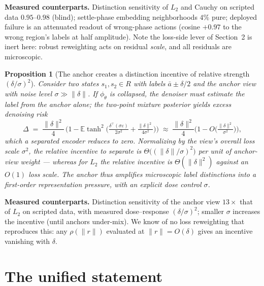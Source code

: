 \documentclass[11pt]{article}
\newtheorem{proposition}{Proposition}
\newcommand{\E}{\mathbb{E}}
\newcommand{\enc}{\phi_\theta}
\begin{document}
\noindent\textbf{Measured counterparts.} Distinction sensitivity of $L_2$ and
Cauchy on scripted data $0.95$--$0.98$ (blind); settle-phase embedding
neighborhoods $4\%$ pure; deployed failure is an attenuated readout of
wrong-phase actions (cosine $+0.97$ to the wrong region's labels at half
amplitude). Note the loss-side lever of Section~2 is inert here: robust
reweighting acts on residual \emph{scale}, and all residuals are microscopic.

\begin{proposition}[The anchor creates a distinction incentive of relative
strength $(\delta/\sigma)^2$]\label{prop:incentive}
Consider two states $s_1, s_2 \in R$ with labels $\bar a \pm \delta/2$ and the
anchor view with noise level $\sigma \gg \|\delta\|$. If $\enc$ is collapsed,
the denoiser must estimate the label from the anchor alone; the two-point
mixture posterior yields excess denoising risk
\begin{equation}
\Delta \;=\; \frac{\|\delta\|^2}{4}\,
\Big(1 - \E\tanh^2\!\big(\tfrac{\delta^\top(\sigma\varepsilon)}{2\sigma^2} +
\tfrac{\|\delta\|^2}{4\sigma^2}\big)\Big)
\;\approx\; \frac{\|\delta\|^2}{4}\Big(1 - O\big(\tfrac{\|\delta\|^2}{\sigma^2}\big)\Big),
\end{equation}
which a separated encoder reduces to zero. Normalizing by the view's overall
loss scale $\sigma^2$, the \emph{relative} incentive to separate is
$\Theta\!\big((\|\delta\|/\sigma)^2\big)$ per unit of anchor-view weight ---
whereas for $L_2$ the relative incentive is $\Theta(\|\delta\|^2)$ against an
$O(1)$ loss scale. The anchor thus amplifies microscopic label distinctions
into a first-order representation pressure, with an explicit dose control
$\sigma$.
\end{proposition}

\noindent\textbf{Measured counterparts.} Distinction sensitivity of the anchor
view $13\times$ that of $L_2$ on scripted data, with measured dose--response
$(\delta/\sigma)^2$; smaller $\sigma$ increases the incentive (until anchors
under-mix). We know of no loss reweighting that reproduces this: any
$\rho(\|r\|)$ evaluated at $\|r\| = O(\delta)$ gives an incentive vanishing with
$\delta$.

\section{The unified statement}
\end{document}
